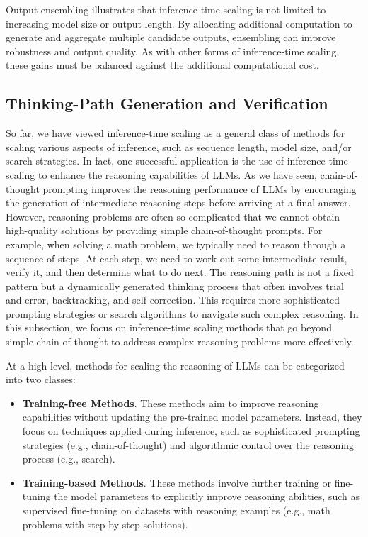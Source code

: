 Output ensembling illustrates that inference-time scaling is not limited to increasing model size or output length. By allocating additional computation to generate and aggregate multiple candidate outputs, ensembling can improve robustness and output quality. As with other forms of inference-time scaling, these gains must be balanced against the additional computational cost.

\subsection{Thinking-Path Generation and Verification}
\label{sec:generating-long-thinking-paths}

So far, we have viewed inference-time scaling as a general class of methods for scaling various aspects of inference, such as sequence length, model size, and/or search strategies. In fact, one successful application is the use of inference-time scaling to enhance the reasoning capabilities of LLMs. As we have seen, chain-of-thought prompting improves the reasoning performance of LLMs by encouraging the generation of intermediate reasoning steps before arriving at a final answer. However, reasoning problems are often so complicated that we cannot obtain high-quality solutions by providing simple chain-of-thought prompts. For example, when solving a math problem, we typically need to reason through a sequence of steps. At each step, we need to work out some intermediate result, verify it, and then determine what to do next. The reasoning path is not a fixed pattern but a dynamically generated thinking process that often involves trial and error, backtracking, and self-correction. This requires more sophisticated prompting strategies or search algorithms to navigate such complex reasoning. In this subsection, we focus on inference-time scaling methods that go beyond simple chain-of-thought to address complex reasoning problems more effectively.

At a high level, methods for scaling the reasoning of LLMs can be categorized into two classes:

\begin{itemize}
\item \vspace{0.5em} \textbf{Training-free Methods}. These methods aim to improve reasoning capabilities without updating the pre-trained model parameters. Instead, they focus on techniques applied during inference, such as sophisticated prompting strategies (e.g., chain-of-thought) and algorithmic control over the reasoning process (e.g., search).
\item \vspace{0.3em} \textbf{Training-based Methods}. These methods involve further training or fine-tuning the model parameters to explicitly improve reasoning abilities, such as supervised fine-tuning on datasets with reasoning examples (e.g., math problems with step-by-step solutions).
\end{itemize}
\vspace{0.5em}

